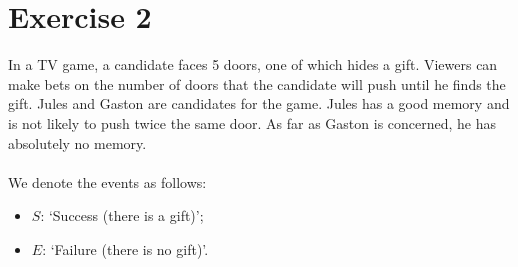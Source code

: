 \documentclass[12pt,thmsa]{article}\usepackage[]{graphicx}\usepackage[]{color}
\begin{document}
\section*{Exercise 2}

In a TV game, a candidate faces 5 doors, one of which hides a gift. Viewers can make bets on the number of doors that the candidate will push until he finds the gift. Jules and Gaston are candidates for the game. Jules has a good memory and is not likely to push twice the same door. As far as Gaston is concerned, he has absolutely no memory.\\
\\
We denote the events as follows:
\begin{itemize}
\item $S$: `Success (there is a gift)';
\item $E$: `Failure (there is no gift)'.
\end{itemize}
\end{document}
